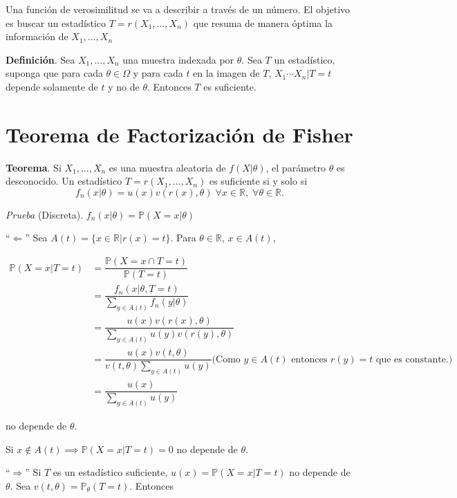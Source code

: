 \documentclass[
  12pt,
]{book}
\begin{document}
Una función de verosimilitud se va a describir a través de un número. El
objetivo es buscar un estadístico \(T=r(X_1,\dots,X_n)\) que resuma de manera
óptima la información de \(X_1,\dots,X_n\)

\textbf{Definición}. Sea \(X_1,\dots,X_n\) una muestra indexada por \(\theta\). Sea \(T\)
un estadístico, suponga que para cada \(\theta \in \Omega\) y para cada \(t\) en la imagen
de \(T\), \(X_1\cdots X_n|T=t\) depende solamente de \(t\) y no de \(\theta\). Entonces \(T\)
es suficiente.

\hypertarget{teorema-de-factorizaciuxf3n-de-fisher}{%
\section{Teorema de Factorización de Fisher}\label{teorema-de-factorizaciuxf3n-de-fisher}}

\textbf{Teorema}. Si \(X_1,\dots,X_n\) es una muestra aleatoria de \(f(X|\theta)\), el
parámetro \(\theta\) es desconocido. Un estadístico \(T=r(X_1,\dots,X_n)\) es
suficiente si y solo si \[f_n(x|\theta) = u(x)v(r(x),\theta)\;\forall x\in
\mathbb R, \; \forall \theta \in \mathbb R.\]

\emph{Prueba} (Discreta). \(f_n(x|\theta) = \mathbb P(X=x|\theta)\)

``\(\Leftarrow\)'' Sea \(A(t) = \{x\in \mathbb R| r(x) =t\}\). Para \(\theta \in \mathbb R\), \(x\in A(t)\),

\begin{align*}
\mathbb P(X=x|T=t) 
& = \dfrac{\mathbb P(X=x \cap T=t)}{\mathbb P (T=t)} \\ 
&= \dfrac{f_n(x|\theta, T=t)}{\displaystyle\sum_{y \in A(t)}f_n(y|\theta)} \\
& = \dfrac{u(x)v(r(x),\theta)}{\displaystyle\sum_{y \in A(t)} u(y)v(r(y),\theta)} \\ 
& = \dfrac{u(x)v(t,\theta)}{\displaystyle v(t,\theta)\sum_{y \in A(t)} u(y)} \text{(Como \(y\in A(t)\) entonces \(r(y) = t\) que es constante.)}\\ 
&= \dfrac{u(x)}{\displaystyle\sum_{y \in A(t)}u(y)}
\end{align*}

no depende de \(\theta\).

Si \(x\notin A(t) \implies \mathbb P(X=x|T=t) = 0\) no depende de \(\theta\).

``\(\Rightarrow\)'' Si \(T\) es un estadístico suficiente, \(u(x) = \mathbb P(X=x|T=t)\) no depende de \(\theta\). Sea \(v(t,\theta) = \mathbb P_{\theta}(T=t)\). Entonces
\end{document}
